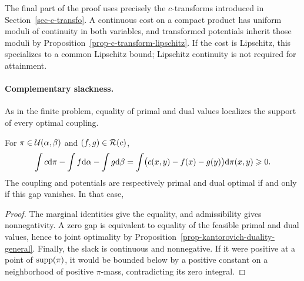 \begin{rem}\label{rem-kantorovich-dual-attainment}
	The final part of the proof uses precisely the $c$-transforms introduced in Section~\ref{sec-c-transfo}. A continuous cost on a compact product has uniform moduli of continuity in both variables, and transformed potentials inherit those moduli by Proposition~\ref{prop-c-transform-lipschitz}. If the cost is Lipschitz, this specializes to a common Lipschitz bound; Lipschitz continuity is not required for attainment.
\end{rem}

\paragraph{Complementary slackness.}
As in the finite problem, equality of primal and dual values localizes the support of every optimal coupling.

\begin{prop}\label{prop-continuous-complementary-slackness}
	For $\pi\in\mathcal{U}(\alpha,\beta)$ and $(f,g)\in\mathcal{R}(c)$,
	\[
		\int c\mathrm{d}\pi-\int f\mathrm{d}\alpha-\int g\mathrm{d}\beta
		=
		\int\bigl(c(x,y)-f(x)-g(y)\bigr)\mathrm{d}\pi(x,y)
		\geqslant0.
	\]
	The coupling and potentials are respectively primal and dual optimal if and only if this gap vanishes. In that case,
\end{prop}
\begin{proof}
	The marginal identities give the equality, and admissibility gives nonnegativity. A zero gap is equivalent to equality of the feasible primal and dual values, hence to joint optimality by Proposition~\ref{prop-kantorovich-duality-general}. Finally, the slack is continuous and nonnegative. If it were positive at a point of $\operatorname{supp}(\pi)$, it would be bounded below by a positive constant on a neighborhood of positive $\pi$-mass, contradicting its zero integral.
\end{proof}

